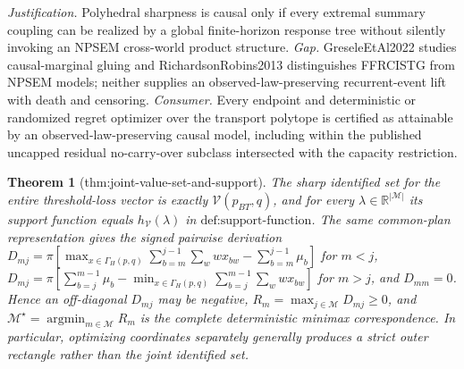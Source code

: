 \documentclass{article}
\newtheorem{theorem}{Theorem}
\begin{document}
\par\smallskip\noindent \textit{Justification.} Polyhedral sharpness is causal only if every extremal summary coupling can be realized by a global finite-horizon response tree without silently invoking an NPSEM cross-world product structure. \textit{Gap.} GreseleEtAl2022 studies causal-marginal gluing and RichardsonRobins2013 distinguishes FFRCISTG from NPSEM models; neither supplies an observed-law-preserving recurrent-event lift with death and censoring. \textit{Consumer.} Every endpoint and deterministic or randomized regret optimizer over the transport polytope is certified as attainable by an observed-law-preserving causal model, including within the published uncapped residual no-carry-over subclass intersected with the capacity restriction.

\begin{theorem}[thm:joint-value-set-and-support]\label{thm:joint-value-set-and-support}
The sharp identified set for the entire threshold-loss vector is exactly \(\mathcal V(p_{BT},q)\), and for every \(\lambda\in\mathbb R^{|\mathcal M|}\) its support function equals \(h_{\mathcal V}(\lambda)\) in \(\text{def:support-function}\). The same common-plan representation gives the signed pairwise derivation \(D_{mj}=\pi[\max_{x\in\Gamma_H(p,q)}\sum_{b=m}^{j-1}\sum_w w x_{bw}-\sum_{b=m}^{j-1}\mu_b]\) for \(m<j\), \(D_{mj}=\pi[\sum_{b=j}^{m-1}\mu_b-\min_{x\in\Gamma_H(p,q)}\sum_{b=j}^{m-1}\sum_w w x_{bw}]\) for \(m>j\), and \(D_{mm}=0\). Hence an off-diagonal \(D_{mj}\) may be negative, \(R_m=\max_{j\in\mathcal M}D_{mj}\ge0\), and \(\mathcal M^\star=\operatorname*{argmin}_{m\in\mathcal M}R_m\) is the complete deterministic minimax correspondence. In particular, optimizing coordinates separately generally produces a strict outer rectangle rather than the joint identified set.
\end{theorem}
\end{document}
